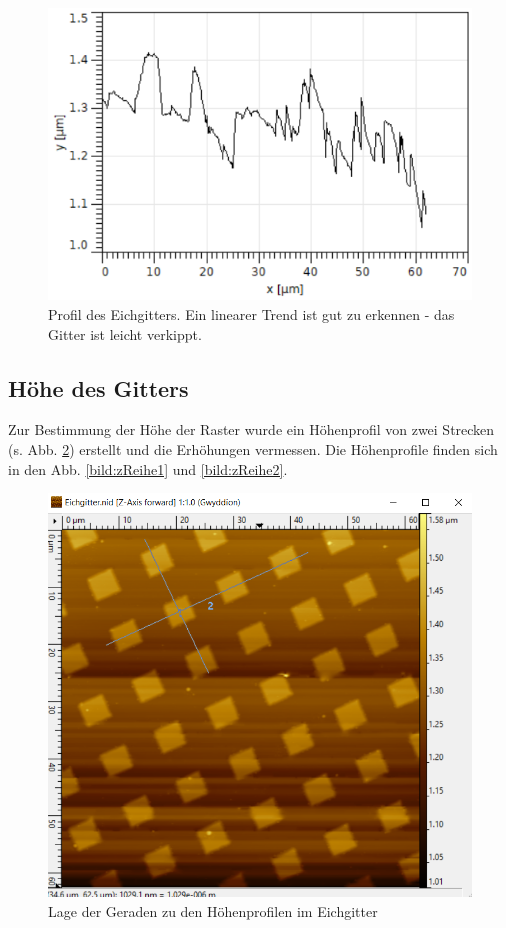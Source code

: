 \begin{figure}[h]
    \centering
    \includegraphics[scale = 0.65]{Bilder/EichKippung.png}
    \caption{Profil des Eichgitters. Ein linearer Trend ist gut zu erkennen - das Gitter ist leicht verkippt.}
    \label{bild:EichKippung}
\end{figure}

\newpage
\subsection{Höhe des Gitters}

Zur Bestimmung der Höhe der Raster wurde ein Höhenprofil von zwei Strecken (s. Abb. \ref{bild:zUebersicht}) erstellt und die Erhöhungen 
vermessen. Die Höhenprofile finden sich in den Abb. \ref{bild:zReihe1} und \ref{bild:zReihe2}. 

\begin{figure}[h]
    \centering
    \includegraphics[scale = 0.4]{Bilder/zUebersicht.png}
    \caption{Lage der Geraden zu den Höhenprofilen im Eichgitter}
    \label{bild:zUebersicht}
\end{figure}

